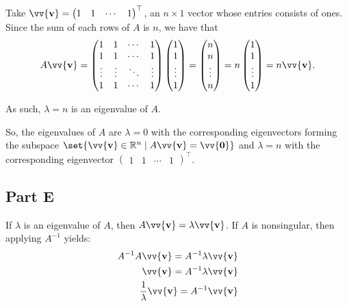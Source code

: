 \documentclass[12pt]{article}
\newcommand{\vect}[1]{\vv{\mathbf{#1}}}
\newcommand{\R}{\mathbb{R}}
\begin{document}
Take $\vect{v} = \begin{pmatrix}
    1 & 1 & \cdots & 1
\end{pmatrix}^\top$, an $n\times1$ vector whose entries consists of ones. Since the sum of each rows of $A$ is $n$, we have that
$$
A\vect{v}
= \begin{pmatrix}
    1 & 1 & \cdots & 1 \\
    1 & 1 & \cdots & 1 \\
    \vdots & \vdots & \ddots & \vdots \\
    1 & 1 & \cdots & 1
\end{pmatrix}
\begin{pmatrix}
    1 \\ 1 \\ \vdots \\ 1
\end{pmatrix}
= \begin{pmatrix}
    n \\ n \\ \vdots \\ n
\end{pmatrix}
= n \begin{pmatrix}
    1 \\ 1 \\ \vdots \\ 1
\end{pmatrix}
= n\vect{v}.
$$

As such, $\lambda=n$ is an eigenvalue of $A$.

So, the eigenvalues of $A$ are $\lambda=0$ with the corresponding eigenvectors forming the subspace $\set{\vect{v}\in\R^n \mid A\vect{v}=\vect{0}}$ and $\lambda=n$ with the corresponding eigenvector $\begin{pmatrix}
    1 & 1 & \cdots & 1
\end{pmatrix}^\top$.

\subsection*{Part E}

If $\lambda$ is an eigenvalue of $A$, then $A\vect{v}=\lambda\vect{v}$. If $A$ is nonsingular, then applying $A^{-1}$ yields:
\begin{align*}
    A^{-1}A\vect{v} = A^{-1}\lambda\vect{v} \\
    \vect{v} = A^{-1}\lambda\vect{v} \\
    \frac{1}{\lambda}\vect{v} = A^{-1}\vect{v} \\
\end{align*}
\end{document}
